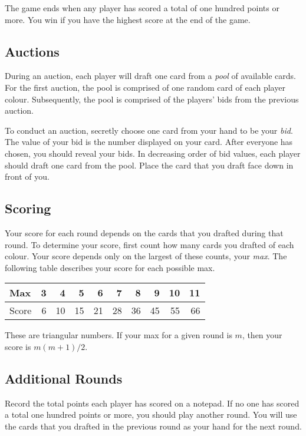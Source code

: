\documentclass[a6paper, parskip=half, DIV=14, 10pt]{scrartcl}
\begin{document}
The game ends when any player has scored a total of one hundred points or more.
You win if you have the highest score at the end of the game.

\vfill

\subsection*{Auctions}
During an auction, each player will draft one card from a \emph{pool} of available cards.
For the first auction, the pool is comprised of one random card of each player colour.
Subsequently, the pool is comprised of the players' bids from the previous auction.


To conduct an auction, secretly choose one card from your hand to be your \emph{bid}.
The value of your bid is the number displayed on your card.
After everyone has chosen, you should reveal your bids.
In decreasing order of bid values, each player should draft one card from the pool.
Place the card that you draft face down in front of you.

\newpage

\subsection*{Scoring}
Your score for each round depends on the cards that you drafted during that round.
To determine your score, first count how many cards you drafted of each colour.
Your score depends only on the largest of these counts, your \emph{max}.
The following table describes your score for each possible max.

\medskip

{
\small
\begin{tabular}{l rrrrrrrrr} \toprule
Max & 3 & 4 & 5 & 6 & 7 & 8 & 9 & 10 & 11 \\ \midrule
Score & 6 & 10 & 15 & 21 & 28 & 36 & 45 & 55 & 66 \\
\bottomrule
\end{tabular}
}

\medskip

These are triangular numbers. If your max for a given round is $m$, then your score is $m(m+1)/2$. 

\vfill

\subsection*{Additional Rounds}
Record the total points each player has scored on a notepad. If no one has scored a total one hundred points or more, you should play another round. You will use the cards that you drafted in the previous round as your hand for the next round.
\vfill
\hrulefill
\end{document}
